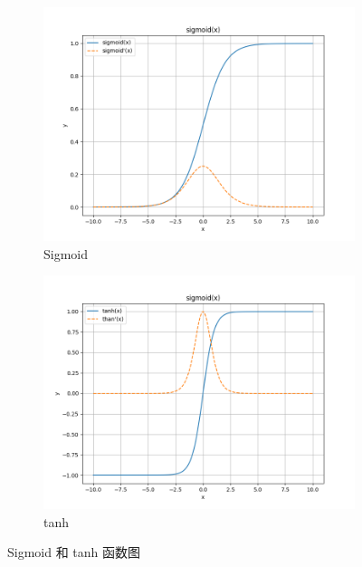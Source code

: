 \begin{figure}[htbp]
    \centering
    \begin{subfigure}{0.49\textwidth}
        \centering
        \includegraphics[width=\textwidth]{images/sigmoid.png}
        \caption{Sigmoid}
        \label{fig:sigmoid}
    \end{subfigure}
    \hfill
    \begin{subfigure}{0.49\textwidth}
        \centering
        \includegraphics[width=\textwidth]{images/tanh.png}
        \caption{tanh}
        \label{fig:tanh}
    \end{subfigure}
    \caption{Sigmoid 和 tanh 函数图}
    \label{fig:Sigmoid}
\end{figure}

